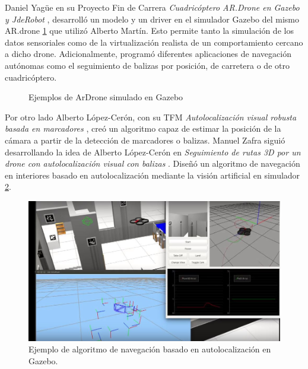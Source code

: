 Daniel Yagüe en su Proyecto Fin de Carrera \textit{Cuadricóptero AR.Drone en Gazebo y JdeRobot} \cite{DanielYague}, desarrolló un modelo y un driver en el simulador Gazebo del mismo AR.drone \ref{FIG:ardronegazebo} que utilizó Alberto Martín. Esto permite tanto la simulación de los datos sensoriales como de la virtualización realista de un comportamiento cercano a dicho drone. Adicionalmente, programó diferentes aplicaciones de navegación autónomas como el seguimiento de balizas por posición, de carretera o de otro cuadricóptero.

\begin{figure}[hbtp]
	\centering
	\hspace{5mm}
	\caption{Ejemplos de ArDrone simulado en Gazebo}	
	\label{FIG:ardronegazebo}
\end{figure}

Por otro lado Alberto López-Cerón, con su TFM \textit{Autolocalización visual robusta basada en marcadores} \cite{AlbertoLopez}, creó un algoritmo capaz de estimar la posición de la cámara a partir de la detección de marcadores o balizas. Manuel Zafra siguió desarrollando la idea de Alberto López-Cerón en \textit{Seguimiento de rutas 3D por un drone con autolocalización visual con balizas} \cite{ManuelZafra}. Diseñó un algoritmo de navegación en interiores basado en autolocalización mediante la visión artificial en simulador \ref{FIG:ejemploautolocalizacion}.

\begin{figure}[hbtp]
	\centering
	\includegraphics[scale=0.55]{imag/ejemploautolocalizacion.jpg}
	\caption{Ejemplo de algoritmo de navegación basado en autolocalización en Gazebo.}	
	\label{FIG:ejemploautolocalizacion}
\end{figure}


